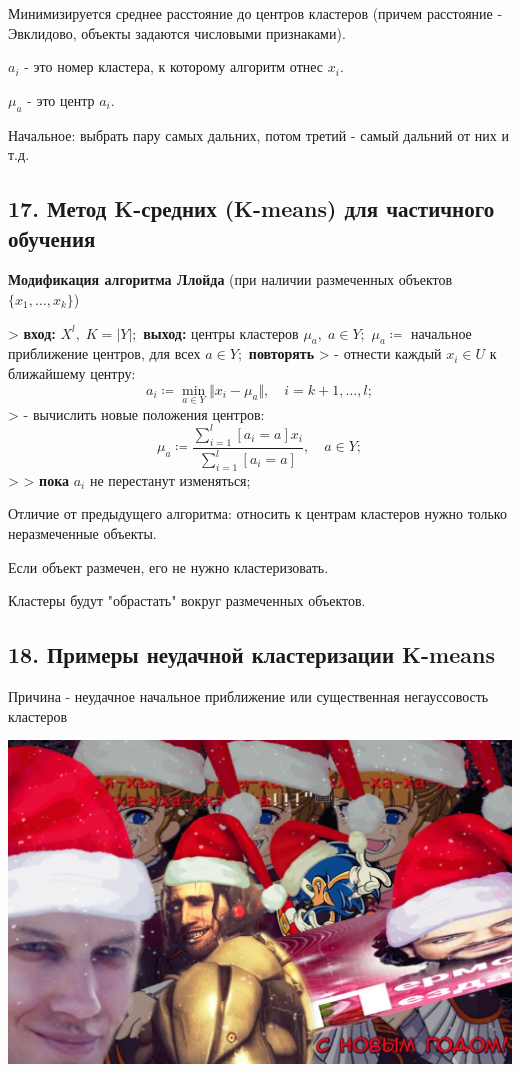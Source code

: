 Минимизируется среднее расстояние до центров кластеров (причем расстояние - Эвклидово, объекты задаются числовыми признаками).

$a_i$ - это номер кластера, к которому алгоритм отнес $x_i$.

$\mu_a$ - это центр $a_i$.

Начальное: выбрать пару самых дальних, потом третий - самый дальний от них
и т.д.

\subsection{17. Метод K-средних (K-means) для частичного обучения}

\textbf{Модификация алгоритма Ллойда} (при наличии размеченных объектов ${\lbrace x_1, \ldots, x_k \rbrace}$)

> \textbf{вход:} $X^l, \; K = {\vert Y \vert}$;\
\textbf{выход:} центры кластеров $\mu_{a}, \; a \in Y$;\
$\mu_a \coloneqq$ начальное приближение центров, для всех $a \in Y$;\
\textbf{повторять}
> - отнести каждый $x_i \in U$ к ближайшему центру:$$a_i \coloneqq \min_{a \in Y}{\Vert x_i - \mu_a \Vert}, \quad i = k+1, \ldots, l;$$
> - вычислить новые положения центров:$$\mu_a \coloneqq \frac{\sum_{i=1}^{l}{{\left[ a_i = a \right]} x_i}}{\sum_{i=1}^{l}{{\left[ a_i = a \right]}}}, \quad a \in Y;$$
>
> \textbf{пока} $a_i$ не перестанут изменяться;

Отличие от предыдущего алгоритма: относить к центрам кластеров нужно только
неразмеченные объекты.

Если объект размечен, его не нужно кластеризовать.

Кластеры будут "обрастать" вокруг размеченных объектов.

\subsection{18. Примеры неудачной кластеризации K-means}

Причина - неудачное начальное приближение или существенная негауссовость
кластеров

\includegraphics[scale=0.3]{figures/samplefigure.jpg}

